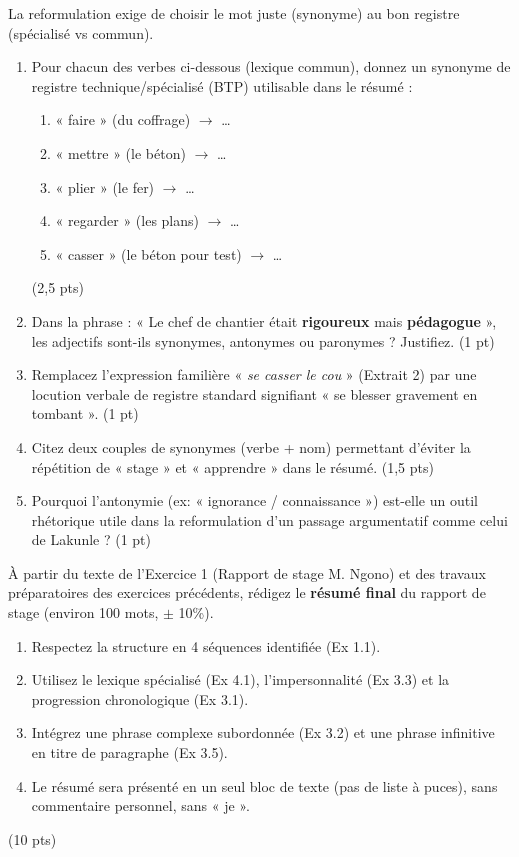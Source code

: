 \documentclass[11pt]{article}
\begin{document}
\begin{exercice}
\label{exo:lexique}
La reformulation exige de choisir le mot juste (synonyme) au bon registre (spécialisé vs commun).

\begin{enumerate}
    \item Pour chacun des verbes ci-dessous (lexique commun), donnez un synonyme de registre technique/spécialisé (BTP) utilisable dans le résumé :
    \begin{enumerate}
        \item « faire » (du coffrage) $\rightarrow$ \dots
        \item « mettre » (le béton) $\rightarrow$ \dots
        \item « plier » (le fer) $\rightarrow$ \dots
        \item « regarder » (les plans) $\rightarrow$ \dots
        \item « casser » (le béton pour test) $\rightarrow$ \dots
    \end{enumerate} \hfill (2,5 pts)
    \item Dans la phrase : « Le chef de chantier était \textbf{rigoureux} mais \textbf{pédagogue} », les adjectifs sont-ils synonymes, antonymes ou paronymes ? Justifiez. \hfill (1 pt)
    \item Remplacez l'expression familière « \textit{se casser le cou} » (Extrait 2) par une locution verbale de registre standard signifiant « se blesser gravement en tombant ». \hfill (1 pt)
    \item Citez deux couples de synonymes (verbe + nom) permettant d'éviter la répétition de « stage » et « apprendre » dans le résumé. \hfill (1,5 pts)
    \item Pourquoi l'antonymie (ex: « ignorance / connaissance ») est-elle un outil rhétorique utile dans la reformulation d'un passage argumentatif comme celui de Lakunle ? \hfill (1 pt)
\end{enumerate}
\end{exercice}

\begin{exercice}
\label{exo:production}
À partir du texte de l'Exercice 1 (Rapport de stage M. Ngono) et des travaux préparatoires des exercices précédents, rédigez le \textbf{résumé final} du rapport de stage (environ 100 mots, $\pm$ 10\%).

\begin{enumerate}
    \item Respectez la structure en 4 séquences identifiée (Ex 1.1).
    \item Utilisez le lexique spécialisé (Ex 4.1), l'impersonnalité (Ex 3.3) et la progression chronologique (Ex 3.1).
    \item Intégrez une phrase complexe subordonnée (Ex 3.2) et une phrase infinitive en titre de paragraphe (Ex 3.5).
    \item Le résumé sera présenté en un seul bloc de texte (pas de liste à puces), sans commentaire personnel, sans « je ».
\end{enumerate}
\hfill (10 pts)
\end{exercice}
\end{document}
